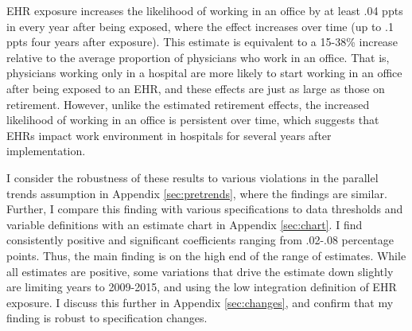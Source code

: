 \documentclass[12pt]{article}
\begin{document}
EHR exposure increases the likelihood of working in an office by at least .04 ppts in every year after being exposed, where the effect increases over time (up to .1 ppts four years after exposure). This estimate is equivalent to a 15-38\% increase relative to the average proportion of physicians who work in an office. That is, physicians working only in a hospital are more likely to start working in an office after being exposed to an EHR, and these effects are just as large as those on retirement. However, unlike the estimated retirement effects, the increased likelihood of working in an office is persistent over time, which suggests that EHRs impact work environment in hospitals for several years after implementation. 

I consider the robustness of these results to various violations in the parallel trends assumption in Appendix \ref{sec:pretrends}, where the findings are similar. Further, I compare this finding with various specifications to data thresholds and variable definitions with an estimate chart in Appendix \ref{sec:chart}. I find consistently positive and significant coefficients ranging from .02-.08 percentage points. Thus, the main finding is on the high end of the range of estimates. While all estimates are positive, some variations that drive the estimate down slightly are limiting years to 2009-2015, and using the low integration definition of EHR exposure. I discuss this further in Appendix \ref{sec:changes}, and confirm that my finding is robust to specification changes. 
\end{document}
